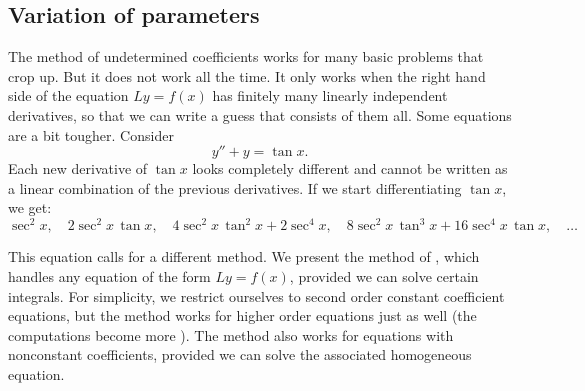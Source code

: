 \subsection{Variation of parameters}

The method of undetermined coefficients works for many basic
problems that crop up.  But it does not work all the time.  It only works
when the right hand side of the equation $Ly = f(x)$ has finitely many
linearly independent derivatives, so that we can write a guess that consists
of them all.  Some equations are a bit tougher.  Consider
\begin{equation*}
y''+y = \tan x .
\end{equation*}
Each new derivative of $\tan x$ looks completely different and
cannot be written as a linear combination of the previous derivatives.
If we start differentiating $\tan x$, we get:
\begin{equation*}
\sec^2 x, \quad
2\sec^2 x \, \tan x, \quad
4 \sec^2 x \, \tan^2 x + 2 \sec^4 x, \quad
8 \sec^2 x \, \tan^3 x + 16 \sec^4 x \, \tan x, \quad \ldots
\end{equation*}

This equation calls for a different method.  We present the method of
\emph{}, which handles any equation of
the form $Ly = f(x)$,
provided we can solve certain integrals.  For simplicity, we restrict
ourselves to second order constant coefficient equations,
but the method works for higher
order equations just as well (the computations become more
). %
The method also works for equations with nonconstant coefficients,
provided we can solve the associated homogeneous equation.

